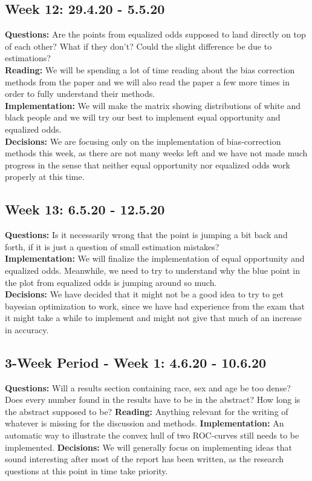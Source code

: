 \documentclass[11pt, fleqn]{article}
\begin{document}
\subsection*{Week 12: 29.4.20 - 5.5.20}
\textbf{Questions:} Are the points from equalized odds supposed to land directly on top of each other? What if they don't? Could the slight difference be due to estimations? \\
\textbf{Reading:} We will be spending a lot of time reading about the bias correction methods from the paper and we will also read the paper a few more times in order to fully understand their methods. \\
\textbf{Implementation:} We will make the matrix showing distributions of white and black people and we will try our best to implement equal opportunity and equalized odds. \\
\textbf{Decisions:} We are focusing only on the implementation of bias-correction methods this week, as there are not many weeks left and we have not made much progress in the sense that neither equal opportunity nor equalized odds work properly at this time.

\subsection*{Week 13: 6.5.20 - 12.5.20}
\textbf{Questions:} Is it necessarily wrong that the point is jumping a bit back and forth, if it is just a question of small estimation mistakes? \\
\textbf{Implementation:} We will finalize the implementation of equal opportunity and equalized odds. Meanwhile, we need to try to understand why the blue point in the plot from equalized odds is jumping around so much. \\
\textbf{Decisions:} We have decided that it might not be a good idea to try to get bayesian optimization to work, since we have had experience from the exam that it might take a while to implement and might not give that much of an increase in accuracy.

\subsection*{3-Week Period - Week 1: 4.6.20 - 10.6.20}
\textbf{Questions:} Will a results section containing race, sex and age be too dense? Does every number found in the results have to be in the abstract? How long is the abstract supposed to be?
\textbf{Reading:} Anything relevant for the writing of whatever is missing for the discussion and methods.
\textbf{Implementation:} An automatic way to illustrate the convex hull of two ROC-curves still needs to be implemented.
\textbf{Decisions:} We will generally focus on implementing ideas that sound interesting after most of the report has been written, as the research questions at this point in time take priority.
\end{document}
